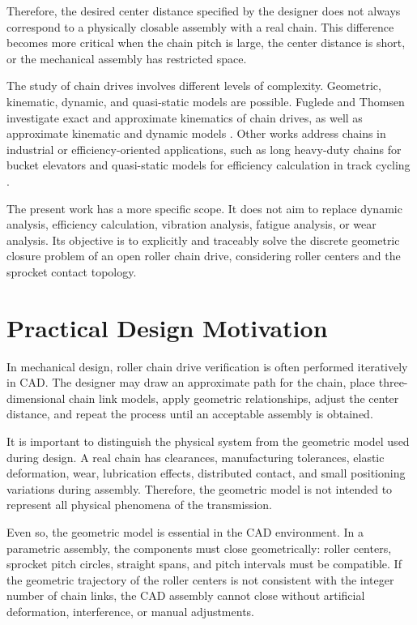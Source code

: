 \documentclass[12pt,a4paper]{article}
\begin{document}
Therefore, the desired center distance specified by the designer does not always correspond to a physically closable assembly with a real chain. This difference becomes more critical when the chain pitch is large, the center distance is short, or the mechanical assembly has restricted space.

The study of chain drives involves different levels of complexity. Geometric, kinematic, dynamic, and quasi-static models are possible. Fuglede and Thomsen investigate exact and approximate kinematics of chain drives, as well as approximate kinematic and dynamic models \cite{fuglede2016mmt,fuglede2016jsv}. Other works address chains in industrial or efficiency-oriented applications, such as long heavy-duty chains for bucket elevators \cite{kim2017} and quasi-static models for efficiency calculation in track cycling \cite{lanaspeze2024}.

The present work has a more specific scope. It does not aim to replace dynamic analysis, efficiency calculation, vibration analysis, fatigue analysis, or wear analysis. Its objective is to explicitly and traceably solve the discrete geometric closure problem of an open roller chain drive, considering roller centers and the sprocket contact topology.

\section{Practical Design Motivation}

In mechanical design, roller chain drive verification is often performed iteratively in CAD. The designer may draw an approximate path for the chain, place three-dimensional chain link models, apply geometric relationships, adjust the center distance, and repeat the process until an acceptable assembly is obtained.

It is important to distinguish the physical system from the geometric model used during design. A real chain has clearances, manufacturing tolerances, elastic deformation, wear, lubrication effects, distributed contact, and small positioning variations during assembly. Therefore, the geometric model is not intended to represent all physical phenomena of the transmission.

Even so, the geometric model is essential in the CAD environment. In a parametric assembly, the components must close geometrically: roller centers, sprocket pitch circles, straight spans, and pitch intervals must be compatible. If the geometric trajectory of the roller centers is not consistent with the integer number of chain links, the CAD assembly cannot close without artificial deformation, interference, or manual adjustments.
\end{document}
